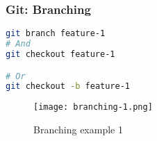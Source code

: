 \begin{frame}[fragile]

\frametitle{Git: Branching}

\begin{multicols}{2}

\begin{lstlisting}[language=Bash]
git branch feature-1
# And
git checkout feature-1

# Or
git checkout -b feature-1

\end{lstlisting}

\begin{figure}
\centering
\texttt{[image: branching-1.png]}
\caption{Branching example 1}
\label{fig:branching-1}

\end{figure}

\end{multicols}
\end{frame}